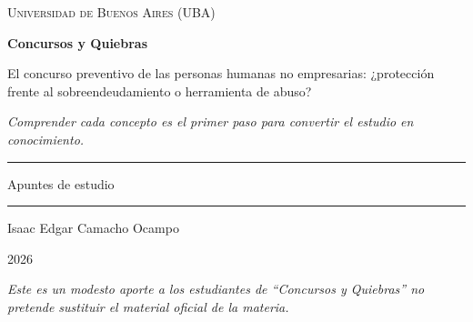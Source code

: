 \documentclass[12pt,oneside]{book}
\newcommand{\universidad}{Universidad de Buenos Aires (UBA)}
\newcommand{\materia}{Concursos y Quiebras}
\newcommand{\titulo}{El concurso preventivo de las personas humanas no empresarias: ¿protección frente al sobreendeudamiento o herramienta de abuso?}
\newcommand{\autor}{Isaac Edgar Camacho Ocampo}
\newcommand{\anio}{2026}
\begin{document}
\begin{titlepage}

\thispagestyle{empty}

\begin{center}

\vspace*{1cm}

{\large \textsc{\universidad}}

\vspace{3cm}

{\Huge \textbf{\materia}}

\vspace{1cm}

{\LARGE \titulo}

\vspace{0.8cm}

\textit{Comprender cada concepto es el primer paso para convertir el estudio en conocimiento.}

\vspace{1.2cm}

\rule{0.70\textwidth}{0.5pt}

\vspace{0.5cm}

{\large Apuntes de estudio}

\vspace{0.5cm}

\rule{0.70\textwidth}{0.5pt}

\vfill

{\large \autor}

\vspace{0.3cm}

{\large \anio}

\end{center}

\vfill

\begin{flushleft}
\textit{Este es un modesto aporte a los estudiantes de ``Concursos y Quiebras'' no pretende sustituir el material oficial de la materia.}
\end{flushleft}

\end{titlepage}

\frontmatter
\pagestyle{plain}
\tableofcontents
\mainmatter
\pagestyle{fancy}
\end{document}
